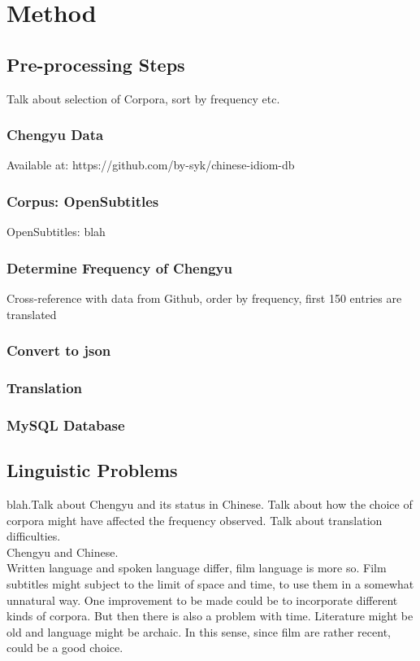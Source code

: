\documentclass[11pt]{article} %
\begin{document}
\section{Method}
\subsection{Pre-processing Steps}
\indent Talk about selection of Corpora, sort by frequency etc.\\
\subsubsection{Chengyu Data}
Available at: https://github.com/by-syk/chinese-idiom-db\\
\subsubsection{Corpus: OpenSubtitles}
\indent OpenSubtitles: blah\\
\subsubsection{Determine Frequency of Chengyu}
\indent Cross-reference with data from Github, order by frequency, first 150 entries are translated
\subsubsection{Convert to json}
\subsubsection{Translation}
\subsubsection{MySQL Database}

\subsection{Linguistic Problems}

\indent blah.Talk about Chengyu and its status in Chinese. Talk about how the choice of corpora might have affected the frequency observed. Talk about translation difficulties.\\
Chengyu and Chinese.\\
Written language and spoken language differ, film language is more so. Film subtitles might subject to the limit of space and time, to use them in a somewhat unnatural way. One improvement to be made could be to incorporate different kinds of corpora. But then there is also a problem with time. Literature might be old and language might be archaic. In this sense, since film are rather recent, could be a good choice.\\
\end{document}
